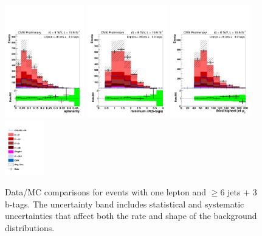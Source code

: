 \begin{figure}[hbtp]
\begin{center}
   \includegraphics[width=0.31\textwidth]{Figures/Analysis_2_Diagrams/LJ_plots_lep/6j3t/lep_aplanarity_6j3t_cumulative_wRatio_noLegend_lin.pdf}
   \includegraphics[width=0.31\textwidth]{Figures/Analysis_2_Diagrams/LJ_plots_lep/6j3t/lep_min_dR_tag_tag_6j3t_cumulative_wRatio_noLegend_lin.pdf}
   \includegraphics[width=0.31\textwidth]{Figures/Analysis_2_Diagrams/LJ_plots_lep/6j3t/lep_jet_pt_3_6j3t_cumulative_wRatio_noLegend_lin.pdf}
   \includegraphics[width=0.15\textwidth]{Figures/Analysis_2_Diagrams/LJ_plots_lep/ttH_legend_1columns.pdf}
   \caption{Data/MC comparisons for events with one lepton and $\ge$6 jets + 3 b-tags.  The uncertainty band includes statistical and systematic uncertainties that affect both the rate and shape of the background distributions.}
   \label{fig:lj_input_II_6j3t_2}
 \end{center}
\end{figure}

